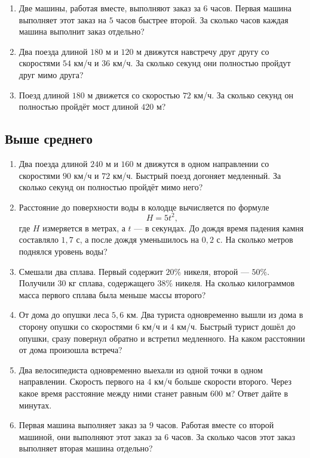 \documentclass[a4paper,12pt]{article}
\begin{document}
\begin{enumerate}[label=\textbf{\arabic*.}]

\item
Две машины, работая вместе, выполняют заказ за \(6\) часов.
Первая машина выполняет этот заказ на \(5\) часов быстрее второй.
За сколько часов каждая машина выполнит заказ отдельно?

\item
Два поезда длиной \(180\) м и \(120\) м движутся навстречу друг другу
со скоростями \(54\) км/ч и \(36\) км/ч.
За сколько секунд они полностью пройдут друг мимо друга?

\item
Поезд длиной \(180\) м движется со скоростью \(72\) км/ч.
За сколько секунд он полностью пройдёт мост длиной \(420\) м?

\end{enumerate}

\subsection*{Выше среднего}

\begin{enumerate}[label=\textbf{\arabic*.},start=4]

\item
Два поезда длиной \(240\) м и \(160\) м движутся в одном направлении
со скоростями \(90\) км/ч и \(72\) км/ч.
Быстрый поезд догоняет медленный.
За сколько секунд он полностью пройдёт мимо него?

\item
Расстояние до поверхности воды в колодце вычисляется по формуле
\[
H=5t^2,
\]
где \(H\) измеряется в метрах, а \(t\) --- в секундах.
До дождя время падения камня составляло \(1{,}7\) с,
а после дождя уменьшилось на \(0{,}2\) с.
На сколько метров поднялся уровень воды?

\item
Смешали два сплава.
Первый содержит \(20\%\) никеля, второй --- \(50\%\).
Получили \(30\) кг сплава, содержащего \(38\%\) никеля.
На сколько килограммов масса первого сплава была меньше массы второго?

\item
От дома до опушки леса \(5{,}6\) км.
Два туриста одновременно вышли из дома в сторону опушки
со скоростями \(6\) км/ч и \(4\) км/ч.
Быстрый турист дошёл до опушки, сразу повернул обратно
и встретил медленного.
На каком расстоянии от дома произошла встреча?

\item
Два велосипедиста одновременно выехали из одной точки
в одном направлении.
Скорость первого на \(4\) км/ч больше скорости второго.
Через какое время расстояние между ними станет равным \(600\) м?
Ответ дайте в минутах.

\item
Первая машина выполняет заказ за \(9\) часов.
Работая вместе со второй машиной, они выполняют этот заказ за \(6\) часов.
За сколько часов этот заказ выполняет вторая машина отдельно?

\end{enumerate}
\end{document}
